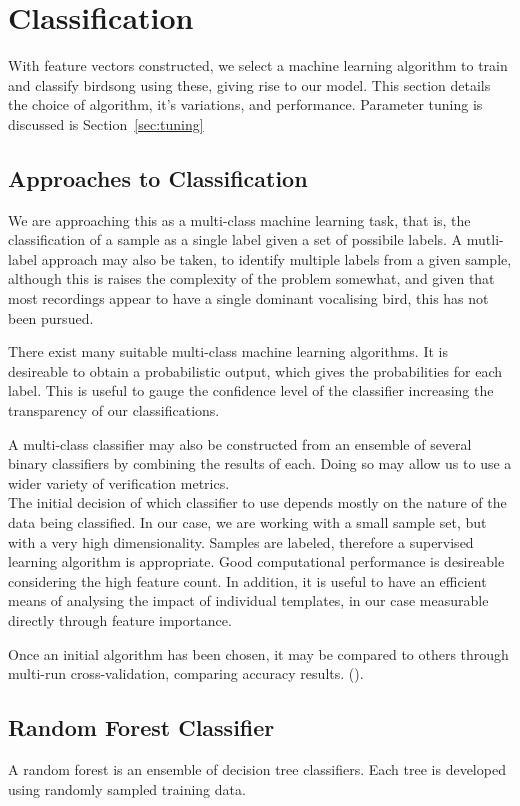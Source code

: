 \section{Classification}
With feature vectors constructed, we select a machine learning algorithm to
train and classify birdsong using these, giving rise to our model.
This section details the choice of algorithm, it's variations, and performance.
Parameter tuning is discussed is Section~\ref{sec:tuning}

\subsection{Approaches to Classification}
We are approaching this as a multi-class machine learning task, that is, the
classification of a sample as a single label given a set of possibile labels.
A mutli-label approach may also be taken, to identify multiple labels from a
given sample, although this is raises the complexity of the problem somewhat,
and given that most recordings appear to have a single dominant vocalising
bird, this has not been pursued.

There exist many suitable multi-class machine learning algorithms.
It is desireable to obtain a probabilistic output, which gives the probabilities
for each label.
This is useful to gauge the confidence level of the classifier increasing the
transparency of our classifications.

A multi-class classifier may also be constructed from an ensemble of several
binary classifiers by combining the results of each.
Doing so may allow  us to use a wider variety of verification metrics.\\

The initial decision of which classifier to use depends mostly on the nature
of the data being classified.
In our case, we are working with a small sample set, but with a very high 
dimensionality.
Samples are labeled, therefore a supervised learning algorithm is appropriate.
Good computational performance is desireable considering the high feature count.
In addition, it is useful to have an efficient means of analysing the impact of
individual templates, in our case measurable directly through feature importance.

Once an initial algorithm has been chosen, it may be compared to others through
multi-run cross-validation, comparing accuracy results.
(\textcite{Bouckaert2003}).


\subsection{Random Forest Classifier}
A random forest is an ensemble of decision tree classifiers.
Each tree is developed using randomly sampled training data.

